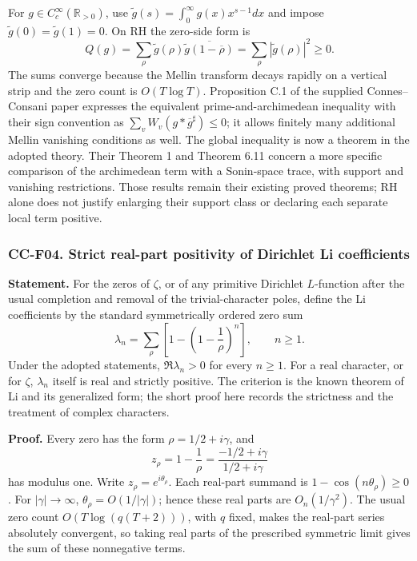 For \(g\in C_c^\infty(\mathbb R_{>0})\), use
\(\widetilde g(s)=\int_0^\infty g(x)x^{s-1}dx\) and impose
\(\widetilde g(0)=\widetilde g(1)=0\). On RH the zero-side form is \[
 Q(g)=\sum_\rho\widetilde g(\rho)
       \overline{\widetilde g(1-\overline\rho)}
     =\sum_\rho|\widetilde g(\rho)|^2\ge0.
\] The sums converge because the Mellin transform decays rapidly on a
vertical strip and the zero count is \(O(T\log T)\). Proposition C.1 of
the supplied Connes--Consani paper expresses the equivalent
prime-and-archimedean inequality with their sign convention as
\(\sum_v W_v(g*\overline g^{\sharp})\le0\); it allows finitely many
additional Mellin vanishing conditions as well. The global inequality is
now a theorem in the adopted theory. Their Theorem 1 and Theorem 6.11
concern a more specific comparison of the archimedean term with a
Sonin-space trace, with support and vanishing restrictions. Those
results remain their existing proved theorems; RH alone does not justify
enlarging their support class or declaring each separate local term
positive.

\subsubsection{CC-F04. Strict real-part positivity of Dirichlet Li
coefficients}\label{cc-f04.-strict-real-part-positivity-of-dirichlet-li-coefficients}

\textbf{Statement.} For the zeros of \(\zeta\), or of any primitive
Dirichlet \(L\)-function after the usual completion and removal of the
trivial-character poles, define the Li coefficients by the standard
symmetrically ordered zero sum \[
 \lambda_n=\sum_\rho\left[1-\left(1-\frac1\rho\right)^n\right],\qquad n\ge1.
\] Under the adopted statements, \(\Re\lambda_n>0\) for every \(n\ge1\).
For a real character, or for \(\zeta\), \(\lambda_n\) itself is real and
strictly positive. The criterion is the known theorem of Li and its
generalized form; the short proof here records the strictness and the
treatment of complex characters.

\textbf{Proof.} Every zero has the form \(\rho=1/2+i\gamma\), and \[
 z_\rho=1-\frac1\rho=\frac{-1/2+i\gamma}{1/2+i\gamma}
\] has modulus one. Write \(z_\rho=e^{i\theta_\rho}\). Each real-part
summand is \(1-\cos(n\theta_\rho)\ge0\). For \(|\gamma|\to\infty\),
\(\theta_\rho=O(1/|\gamma|)\); hence these real parts are
\(O_n(1/\gamma^2)\). The usual zero count \(O(T\log(q(T+2)))\), with
\(q\) fixed, makes the real-part series absolutely convergent, so taking
real parts of the prescribed symmetric limit gives the sum of these
nonnegative terms.

